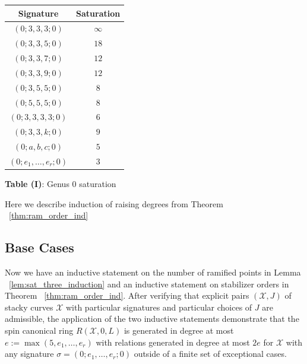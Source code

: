 \documentclass{amsart}
\theoremstyle{plain}
\theoremstyle{definition}
\theoremstyle{remark}
\numberwithin{equation}{section}
\newcommand\ssec{\subsection}
\newcommand \sx{\mathscr X}
\begin{document}
\begin{longtable}
	{| c | c |}
	\hline
	Signature & Saturation \\
	\hline
	\hline

	$(0; 3, 3, 3; 0)$ & $\infty$ \\	\hline

	$(0; 3, 3, 5; 0)$ & $18$ \\	\hline
	
	$(0; 3, 3, 7; 0)$ & $12$ \\	\hline
	
	$(0; 3, 3, 9; 0)$ & $12$ \\	\hline
	
	$(0; 3, 5, 5; 0)$ & $8$ \\	\hline
	
	$(0; 5, 5, 5; 0)$ & $8$ \\	\hline
	
	$(0; 3, 3, 3, 3; 0)$ & $6$ \\	\hline
	
	\hline
	\hline
	
	$(0; 3, 3, k; 0)$ & $9$ \\	\hline
	
	$(0; a, b, c; 0)$ & $5$ \\	\hline
	
	$(0; e_1, \ldots, e_r; 0)$ & $3$ \\	\hline
\end{longtable}

\begin{center}
\textbf{Table (I)}: Genus 0 saturation
\end{center}

Here we describe induction of raising degrees from Theorem ~\ref{thm:ram_order_ind}

\ssec{Base Cases}
\label{ssec:g_0_base}
Now we have an inductive statement on the number of ramified
points in Lemma ~\ref{lem:sat_three_induction} and
an inductive statement on stabilizer orders in Theorem
~\ref{thm:ram_order_ind}. After verifying that explicit pairs
$(\sx, J)$ of stacky curves $\sx$ with particular signatures and
particular choices of $J$ are admissible, the application of the
two inductive statements demonstrate that the spin canonical ring
$R(\sx , 0, L)$ is generated in degree at most $e := \max(5, e_1,
\ldots, e_r)$ with relations generated in degree at most $2e$ for
$\sx$ with any signature $\sigma = (0; e_1, \ldots , e_r; 0)$ outside
of a finite set of exceptional cases.
\end{document}
